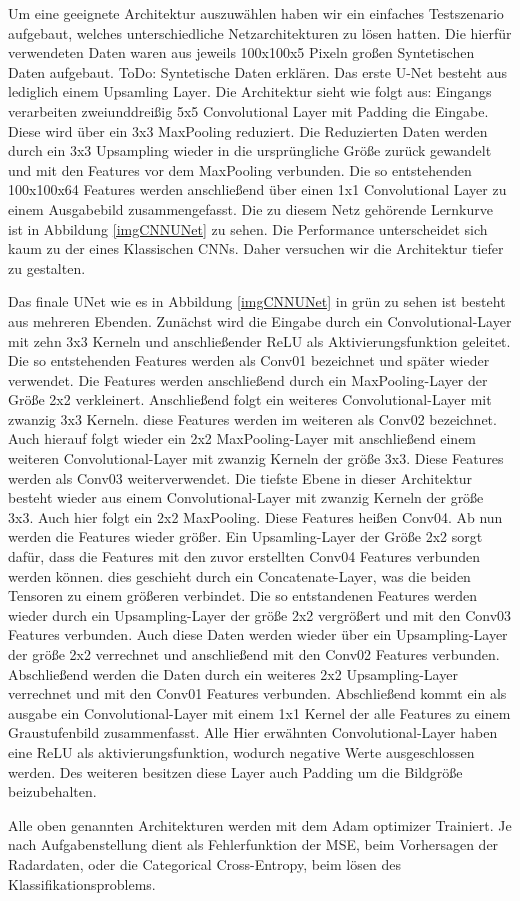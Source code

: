 Um eine geeignete Architektur auszuwählen haben wir ein einfaches Testszenario aufgebaut, welches unterschiedliche Netzarchitekturen zu lösen hatten. Die hierfür verwendeten Daten waren aus jeweils 100x100x5 Pixeln großen Syntetischen Daten aufgebaut.
ToDo: Syntetische Daten erklären.
Das erste U-Net besteht aus lediglich einem Upsamling Layer. Die Architektur sieht wie folgt aus:
Eingangs verarbeiten zweiunddreißig 5x5 Convolutional Layer mit Padding die Eingabe. Diese wird über ein 3x3 MaxPooling reduziert. Die Reduzierten Daten werden durch ein 3x3 Upsampling wieder in die ursprüngliche Größe zurück gewandelt und mit den Features vor dem MaxPooling verbunden. Die so entstehenden 100x100x64 Features werden anschließend über einen 1x1 Convolutional Layer zu einem Ausgabebild zusammengefasst.
Die zu diesem Netz gehörende Lernkurve ist in Abbildung \ref{imgCNNUNet} zu sehen. Die Performance unterscheidet sich kaum zu der eines Klassischen CNNs. Daher versuchen wir die Architektur tiefer zu gestalten.

Das finale UNet wie es in Abbildung \ref{imgCNNUNet} in grün zu sehen ist besteht aus mehreren Ebenden.
Zunächst wird die Eingabe durch ein Convolutional-Layer mit zehn 3x3 Kerneln und anschließender ReLU als Aktivierungsfunktion geleitet. Die so entstehenden Features werden als Conv01 bezeichnet und später wieder verwendet.
Die Features werden anschließend durch ein MaxPooling-Layer der Größe 2x2 verkleinert. Anschließend folgt ein weiteres Convolutional-Layer mit zwanzig 3x3 Kerneln. diese Features werden im weiteren als Conv02 bezeichnet.
Auch hierauf folgt wieder ein 2x2 MaxPooling-Layer mit anschließend einem weiteren Convolutional-Layer mit zwanzig Kerneln der größe 3x3. Diese Features werden als Conv03 weiterverwendet.
Die tiefste Ebene in dieser Architektur besteht wieder aus einem Convolutional-Layer mit zwanzig Kerneln der größe 3x3. Auch hier folgt ein 2x2 MaxPooling. Diese Features heißen Conv04.
Ab nun werden die Features wieder größer. Ein Upsamling-Layer der Größe 2x2 sorgt dafür, dass die Features mit den zuvor erstellten Conv04 Features verbunden werden können. dies geschieht durch ein Concatenate-Layer, was die beiden Tensoren zu einem größeren verbindet. Die so entstandenen Features werden wieder durch ein Upsampling-Layer der größe 2x2 vergrößert und mit den Conv03 Features verbunden. Auch diese Daten werden wieder über ein Upsampling-Layer der größe 2x2 verrechnet und anschließend mit den Conv02 Features verbunden. Abschließend werden die Daten durch ein weiteres 2x2 Upsampling-Layer verrechnet und mit den Conv01 Features verbunden. Abschließend kommt ein als ausgabe ein Convolutional-Layer mit einem 1x1 Kernel der alle Features zu einem Graustufenbild zusammenfasst.
Alle Hier erwähnten Convolutional-Layer haben eine ReLU als aktivierungsfunktion, wodurch negative Werte ausgeschlossen werden. Des weiteren besitzen diese Layer auch Padding um die Bildgröße beizubehalten.

Alle oben genannten Architekturen werden mit dem Adam optimizer Trainiert. Je nach Aufgabenstellung dient als Fehlerfunktion der MSE, beim Vorhersagen der Radardaten, oder die Categorical Cross-Entropy, beim lösen des Klassifikationsproblems.


